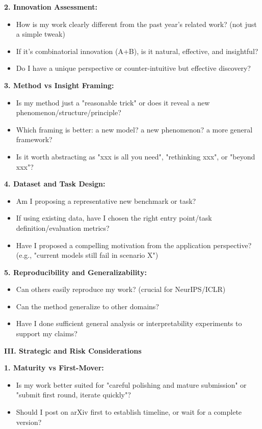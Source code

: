 \documentclass[11pt,a4paper]{article}
\begin{document}
\textbf{2. Innovation Assessment:}
\begin{itemize}
    \item How is my work clearly different from the past year's related work? (not just a simple tweak)
    \item If it's combinatorial innovation (A+B), is it natural, effective, and insightful?
    \item Do I have a unique perspective or counter-intuitive but effective discovery?
\end{itemize}

\textbf{3. Method vs Insight Framing:}
\begin{itemize}
    \item Is my method just a "reasonable trick" or does it reveal a new phenomenon/structure/principle?
    \item Which framing is better: a new model? a new phenomenon? a more general framework?
    \item Is it worth abstracting as "xxx is all you need", "rethinking xxx", or "beyond xxx"?
\end{itemize}

\textbf{4. Dataset and Task Design:}
\begin{itemize}
    \item Am I proposing a representative new benchmark or task?
    \item If using existing data, have I chosen the right entry point/task definition/evaluation metrics?
    \item Have I proposed a compelling motivation from the application perspective? (e.g., "current models still fail in scenario X")
\end{itemize}

\textbf{5. Reproducibility and Generalizability:}
\begin{itemize}
    \item Can others easily reproduce my work? (crucial for NeurIPS/ICLR)
    \item Can the method generalize to other domains?
    \item Have I done sufficient general analysis or interpretability experiments to support my claims?
\end{itemize}

\textbf{III. Strategic and Risk Considerations}

\textbf{1. Maturity vs First-Mover:}
\begin{itemize}
    \item Is my work better suited for "careful polishing and mature submission" or "submit first round, iterate quickly"?
    \item Should I post on arXiv first to establish timeline, or wait for a complete version?
\end{itemize}
\end{document}
